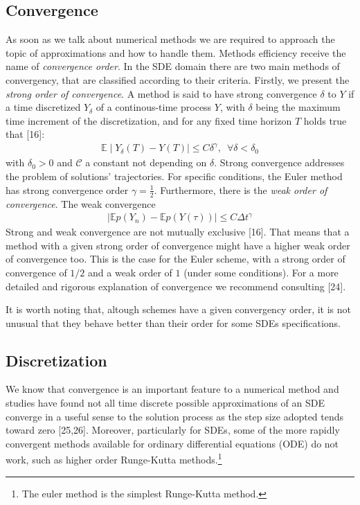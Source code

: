 \documentclass[12pt,twoside]{reedthesis}
\theoremstyle{definition}
\theoremstyle{definition}
\theoremstyle{remark}
\begin{document}
  \subsection{Convergence}\label{convergence}
  
  As soon as we talk about numerical methods we are required to approach
  the topic of approximations and how to handle them. Methods efficiency
  receive the name of \emph{convergence order}. In the SDE domain there
  are two main methods of convergency, that are classified according to
  their criteria. Firstly, we present the \emph{strong order of
  convergence}. A method is said to have strong convergence \(\delta\) to
  \(Y\) if a time discretized \(Y_{\delta}\) of a continous-time process
  \(Y\), with \(\delta\) being the maximum time increment of the
  discretization, and for any fixed time horizon \(T\) holds true that
  {[}16{]}:
  \begin{align*}
  \mathbb{E} \mid Y_{\delta}(T) - Y(T) \mid \leq C \delta^{\gamma}, \,\,\, \forall \delta < \delta_0
  \end{align*}
  with \(\delta_0 > 0\) and \(\mathcal{C}\) a constant not depending on
  \(\delta\). Strong convergence addresses the problem of solutions'
  trajectories. For specific conditions, the Euler method has strong
  convergence order \(\gamma = \frac{1}{2}\). Furthermore, there is the
  \emph{weak order of convergence}. The weak convergence
  \begin{align*}
  \mid  \mathbb{E}p(Y_n) - \mathbb{E}p(Y(\tau)) \mid \leq C \Delta t^{\gamma}
  \end{align*}
  Strong and weak convergence are not mutually exclusive {[}16{]}. That
  means that a method with a given strong order of convergence might have
  a higher weak order of convergence too. This is the case for the Euler
  scheme, with a strong order of convergence of \(1/2\) and a weak order
  of \(1\) (under some conditions). For a more detailed and rigorous
  explanation of convergence we recommend consulting {[}24{]}.
  
  It is worth noting that, altough schemes have a given convergency order,
  it is not unusual that they behave better than their order for some SDEs
  specifications.
  
  \subsection{Discretization}\label{discretization}
  
  We know that convergence is an important feature to a numerical method
  and studies have found not all time discrete possible approximations of
  an SDE converge in a useful sense to the solution process as the step
  size adopted tends toward zero {[}25,26{]}. Moreover, particularly for
  SDEs, some of the more rapidly convergent methods available for ordinary
  differential equations (ODE) do not work, such as higher order
  Runge-Kutta methods.\footnote{The euler method is the simplest
    Runge-Kutta method.}
  
\end{document}
